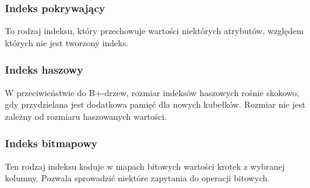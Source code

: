 \subsubsection*{Indeks pokrywający}
To rodzaj indeksu, który przechowuje wartości niektórych atrybutów, względem których nie jest tworzony indeks.

\subsubsection*{Indeks haszowy}
W przeciwieństwie do B+-drzew, rozmiar indeksów haszowych rośnie skokowo, gdy przydzielana jest dodatkowa pamięć dla nowych kubełków.
Rozmiar nie jest zależny od rozmiaru haszowanych wartości.

\subsubsection*{Indeks bitmapowy}
Ten rodzaj indeksu koduje w mapach bitowych wartości krotek z wybranej kolumny. Pozwala sprowadzić niektóre zapytania do operacji bitowych.

